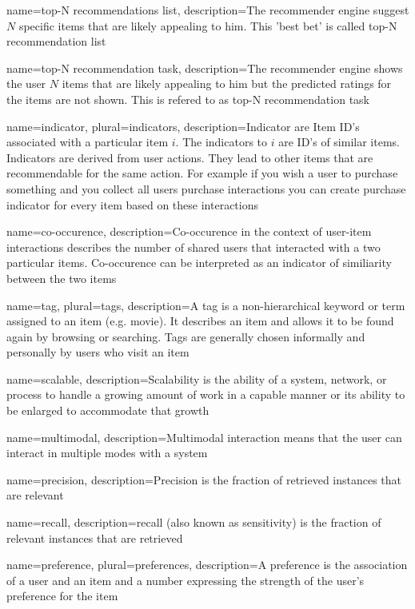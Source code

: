 {
name=top-N recommendations list,
description={The recommender engine suggest $N$ specific items that are likely appealing to him. This 'best bet' is called top-N recommendation list}
}

{
name=top-N recommendation task,
description={The recommender engine shows the user $N$ items that are likely appealing to him but the predicted ratings for the items are not shown. This is refered to as top-N recommendation task}
}


{
name={indicator},
plural={indicators},
description={Indicator are Item ID's associated with a particular item $i$. The indicators to $i$ are  ID's of similar items. Indicators are derived from user actions. They lead to other items that are recommendable for the same action. For example if you wish a user to purchase something and you collect all users purchase interactions you can create purchase indicator for every item based on these interactions}
}

{
name={co-occurence},
description={Co-occurence in the context of user-item interactions describes the number of shared users that interacted with a two particular items. Co-occurence can be interpreted as an indicator of similiarity between the two items}
}

{
name={tag},
plural={tags},
description={A tag is a non-hierarchical keyword or term assigned to an item (e.g. movie). It describes an item and allows it to be found again by browsing or searching. Tags are generally chosen informally and personally by users who visit an item}
}

{
name={scalable},
description={Scalability is the ability of a system, network, or process to handle a growing amount of work in a capable manner or its ability to be enlarged to accommodate that growth}
}

{
name={multimodal},
description={Multimodal interaction means that the user can interact in multiple modes with a system}
}

{
name={precision},
description={Precision is the fraction of retrieved instances that are relevant}
}

{
name={recall},
description={recall (also known as sensitivity) is the fraction of relevant instances that are retrieve}d 
}

{
name={preference},
plural={preferences},
description={A preference is the association of a user and an item and a number expressing the strength of the user's preference for the item}
}

